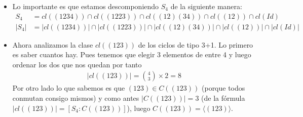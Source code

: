 \begin{ej}
\begin{itemize}
		\item Lo importante es que estamos descomponiendo $S_4$ de la siguiente manera:
		\begin{align*}
		S_4 &= cl((1234)) \cap cl((1223)) \cap cl((12)(34)) \cap cl((12)) \cap cl(Id) \\
		|S_4| &= |cl((1234))| \cap |cl((1223))| \cap |cl((12)(34))| \cap |cl((12))| \cap |cl(Id)|
		\end{align*}
		\item Ahora analizamos la clase $cl((123))$ de los ciclos de tipo 3+1. Lo primero es saber cuantos hay. Pues tenemos que elegir 3 elementos de entre 4 y luego ordenar los dos que nos quedan por tanto
		\begin{align*}
		|cl((123))| = \binom{4}{3} \times 2 = 8
		\end{align*}
		Por otro lado lo que sabemos es que $(123) \in C((123))$ (porque todos conmutan consigo mismos) y como antes $|C((123))| = 3$ (de la fórmula $|cl((123))| = [S_4:C((123))]$), luego $C((123)) = \langle (123) \rangle$.
		

\end{itemize}
\end{ej}

